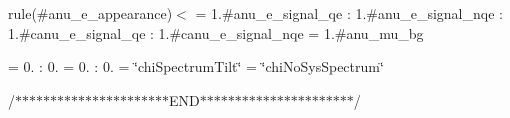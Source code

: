 rule(\#anu\+\_\+e\+\_\+appearance)$<$  = 1.\#anu\+\_\+e\+\_\+signal\+\_\+qe \+: 1.\#anu\+\_\+e\+\_\+signal\+\_\+nqe \+: 1.\#canu\+\_\+e\+\_\+signal\+\_\+qe \+: 1.\#canu\+\_\+e\+\_\+signal\+\_\+nqe  = 1.\#anu\+\_\+mu\+\_\+bg

= 0. \+: 0.  = 0. \+: 0.  = \char`\"{}chi\+Spectrum\+Tilt\char`\"{}  = \char`\"{}chi\+No\+Sys\+Spectrum\char`\"{}

\begin{quote}


\end{quote}


/$\ast$$\ast$$\ast$$\ast$$\ast$$\ast$$\ast$$\ast$$\ast$$\ast$$\ast$$\ast$$\ast$$\ast$$\ast$$\ast$$\ast$$\ast$$\ast$$\ast$$\ast$$\ast$\+E\+N\+D$\ast$$\ast$$\ast$$\ast$$\ast$$\ast$$\ast$$\ast$$\ast$$\ast$$\ast$$\ast$$\ast$$\ast$$\ast$$\ast$$\ast$$\ast$$\ast$$\ast$$\ast$$\ast$/ 
